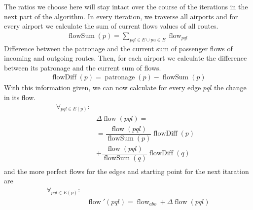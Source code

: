 \documentclass[twocolumn]{tum-article}
\DeclareMathOperator{\patronage}{patronage}
\DeclareMathOperator{\flow}{flow}
\DeclareMathOperator{\flowSum}{flowSum}
\DeclareMathOperator{\flowDiff}{flowDiff}
\begin{document}
The ratios we choose here will stay intact over the course of the iterations in the next part of the algorithm.
In every iteration, we traverse all airports and for every airport we calculate the sum of current flows values of all routes. 
\begin{equation}
\begin{aligned}
\flowSum(p) = \displaystyle\sum_{pql \in E \cup pu \in E}\flow_{pql}
\end{aligned}
\end{equation}
Difference between the patronage and the current sum of passenger flows of incoming and outgoing routes. 
Then, for each airport we calculate the difference between its patronage and the current sum of flows.
\begin{equation}
\begin{aligned}
\flowDiff(p) = \patronage(p) - \flowSum(p) 
\end{aligned}
\end{equation}
With this information given, we can now calculate for every edge $pql$ the change in its flow. 
\begin{equation}
\begin{aligned}
\forall_{pql \in E(p)}: & \\
& \Delta \flow(pql) = & \\ 
& ={} \dfrac{\flow(pql)}{\flowSum(p)}\flowDiff(p) \\
& +{} \dfrac{\flow(pql)}{\flowSum(q)}\flowDiff(q) \\
\end{aligned}
\end{equation}
and the more perfect flows for the edges and starting point for the next itaration are
\begin{equation}
\begin{aligned}
\forall_{pql \in E(p)}: & \\
& \flow'(pql) = \flow_{abo} + \Delta \flow(pql)
\end{aligned}
\end{equation}
\end{document}
